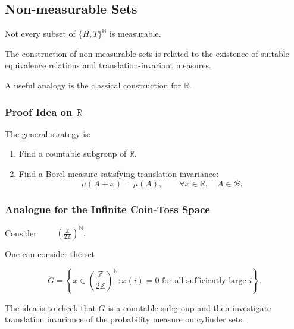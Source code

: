 \subsection{Non-measurable Sets}

\begin{important}
Not every subset of
\(\{H,T\}^{\mathbb{N}}\)
is measurable.
\end{important}

The construction of non-measurable sets is related to the existence
of suitable equivalence relations and translation-invariant measures.

A useful analogy is the classical construction for $\mathbb{R}$.


\subsubsection{Proof Idea on $\mathbb{R}$}

The general strategy is:

\begin{enumerate}

    \item Find a countable subgroup of $\mathbb{R}$.

    \item Find a Borel measure satisfying translation invariance:
    \[
    \mu(A+x)=\mu(A),
    \qquad
    \forall x\in\mathbb{R},
    \quad
    A\in\mathcal{B}.
    \]

\end{enumerate}


\subsubsection{Analogue for the Infinite Coin-Toss Space}

Consider
\(\qquad
\left(\frac{\mathbb{Z}}{2\mathbb{Z}}\right)^{\mathbb{N}}.
\)

One can consider the set

\[
G
=
\left\{
x\in
\left(\frac{\mathbb{Z}}{2\mathbb{Z}}\right)^{\mathbb{N}}
:
x(i)=0
\text{ for all sufficiently large }i
\right\}.
\]

The idea is to check that $G$ is a countable subgroup and then
investigate translation invariance of the probability measure on
cylinder sets.

